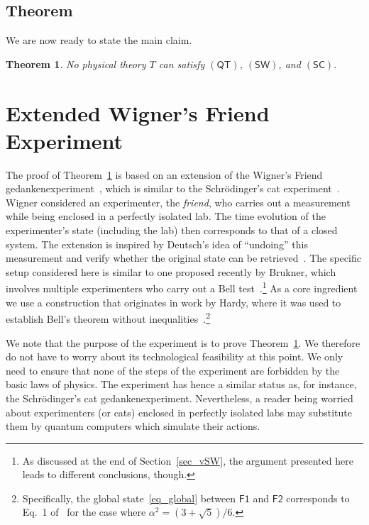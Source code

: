 \documentclass[12pt]{article}
\theoremstyle{plain}
\newtheorem{theorem}{Theorem}
\theoremstyle{definition}
\newcommand*{\Friendone}{\mathsf{F1}}
\newcommand*{\Friendtwo}{\mathsf{F2}}
\newcommand*{\QT}{\mathsf{(QT)}}
\newcommand*{\SW}{\mathsf{(SW)}}
\newcommand*{\SelfCons}{\mathsf{(SC)}}
\begin{document}
\subsection{Theorem}

We are now ready to state the main claim. 

\begin{shaded}
\begin{theorem} \label{thm_main}
  No physical theory $T$ can satisfy $\QT$, $\SW$, and $\SelfCons$. 
\end{theorem}
\end{shaded}


\section{Extended Wigner's Friend Experiment} \label{sec_experiment}

The proof of Theorem~\ref{thm_main} is based on an extension of the Wigner's Friend gedan\-ken\-ex\-peri\-ment~\cite{Wigner67}, which is similar to the Schr\"odinger's cat experiment~\cite{Schroedinger35}. Wigner considered an experimenter, the \emph{friend}, who carries out a measurement while being enclosed in a perfectly isolated lab. The time evolution of the experimenter's state (including the lab) then corresponds to that of a closed system. The extension is inspired by Deutsch's idea of ``undoing'' this measurement and verify whether the original state can be retrieved~\cite{Deutsch85}. The specific setup considered here is similar to one proposed recently by Brukner, which involves multiple experimenters who carry out a Bell test~\cite{Brukner15}.\footnote{As discussed at the end of Section~\ref{sec_vSW}, the argument presented here leads to different conclusions, though.}  As a  core ingredient we use a construction that originates in work by Hardy, where it was used to establish Bell's theorem without inequalities~\cite{Hardy92,Hardy93}.\footnote{Specifically, the global state~\eqref{eq_global} between $\Friendone$ and $\Friendtwo$ corresponds to Eq.~1 of~\cite{Hardy93} for the case where $\alpha^2 =  (3 + \sqrt{5})/6$.}  

We note that the purpose of the experiment is to prove Theorem~\ref{thm_main}. We therefore do not have to worry about its technological feasibility at this point. We only need to ensure that none of the steps of the experiment are forbidden by the basic laws of physics. The experiment has hence a similar status as, for instance, the Schr\"odinger's cat gedankenexperiment. Nevertheless, a reader being worried about experimenters (or cats) enclosed in perfectly isolated labs may substitute them by quantum computers which simulate their actions. 
\end{document}
